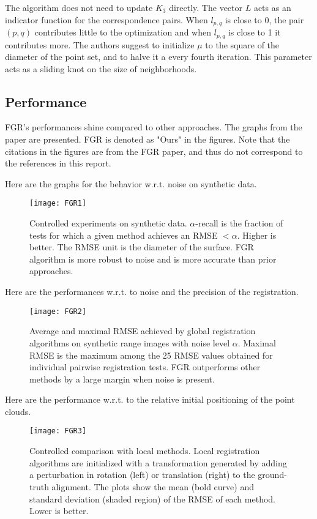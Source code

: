 \documentclass[10pt,a4paper]{article}
\begin{document}
The algorithm does not need to update $K_3$ directly. The vector $L$ acts as an indicator function for the correspondence pairs. When $l_{p,q}$ is close to 0, the pair $(p,q)$ contributes little to the optimization and when $l_{p,q}$ is close to 1 it contributes more. The authors suggest to initialize $\mu$ to the square of the diameter of the point set, and to halve it a every fourth iteration. This parameter acts as a sliding knot on the size of neighborhoods.
\newpage

\subsection{Performance}

FGR's performances shine compared to other approaches.  The graphs from the paper are presented. FGR is denoted as "Ours" in the figures. Note that the citations in the figures are from the FGR paper, and thus do not correspond to the references in this report. 

Here are the graphs for the behavior w.r.t. noise on synthetic data.  

\begin{figure}[h]
	\centering
	\centerline{
	\texttt{[image: FGR1]}}
	\caption{Controlled experiments on synthetic data. $\alpha$-recall is the fraction of tests for which a given method achieves an RMSE $< \alpha$. Higher is better. The RMSE unit is the diameter of the surface. FGR algorithm is more robust to noise and is more accurate than prior approaches.}
	\label{fig:fgr1}
\end{figure}

Here are the performances w.r.t. to noise and the precision of the registration. 

\begin{figure}[h]
	\centering
	\centerline{
	\texttt{[image: FGR2]}}
	\caption{Average and maximal RMSE achieved by global registration algorithms on synthetic range images with noise level $\alpha$. Maximal RMSE is the maximum among the 25 RMSE values obtained for individual pairwise registration tests. FGR outperforms other methods by a large margin when noise is present. }
	\label{fig:fgr2}
\end{figure}
\newpage
Here are the performance w.r.t. to the relative initial positioning of the point clouds.

\begin{figure}[H]
	\centering
	\centerline{
	\texttt{[image: FGR3]}}
	\caption{Controlled comparison with local methods. Local registration algorithms are initialized with a transformation generated by adding a perturbation in rotation (left) or translation (right) to the ground-truth alignment. The plots show the mean (bold curve) and standard deviation (shaded region) of the RMSE of each method. Lower is better.}
	\label{fig:fgr3}
\end{figure}
\end{document}
